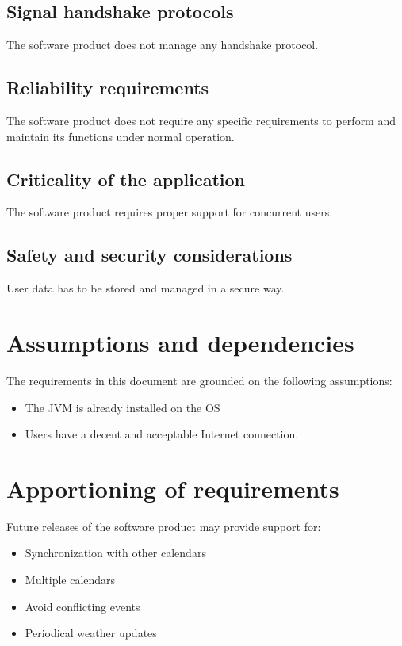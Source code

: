 \documentclass[10pt,a4paper,titlepage]{article}
\begin{document}
\subsection{Signal handshake protocols}
The software product does not manage any handshake protocol. 

\subsection{Reliability requirements}
The software product does not require any specific requirements to perform and maintain its functions under normal operation. 

\subsection{Criticality of the application}
The software product requires proper support for concurrent users. 

\subsection{Safety and security considerations}
User data has to be stored and managed in a secure way.

\section{Assumptions and dependencies}
The requirements in this document are grounded on the following assumptions:
\begin{itemize}
\item The JVM is already installed on the OS
\item Users have a decent and acceptable Internet connection.
\end{itemize}

\section{Apportioning of requirements}
Future releases of the software product may provide support for:
\begin{itemize}
\item Synchronization with other calendars
\item Multiple calendars
\item Avoid conflicting events
\item Periodical weather updates
\end{itemize}
\end{document}
